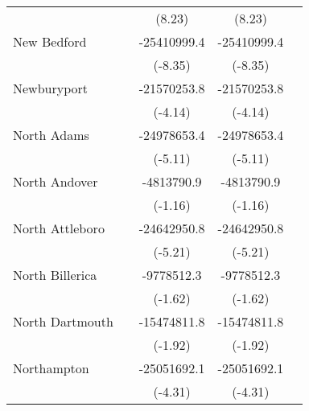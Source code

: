 {\begin{tabular}{l*{4}{c}}
                    &                     &      (8.23)         &      (8.23)         &                     \\
\addlinespace
New Bedford         &                     & -25410999.4\sym{***}& -25410999.4\sym{***}&                     \\
                    &                     &     (-8.35)         &     (-8.35)         &                     \\
\addlinespace
Newburyport         &                     & -21570253.8\sym{***}& -21570253.8\sym{***}&                     \\
                    &                     &     (-4.14)         &     (-4.14)         &                     \\
\addlinespace
North Adams         &                     & -24978653.4\sym{***}& -24978653.4\sym{***}&                     \\
                    &                     &     (-5.11)         &     (-5.11)         &                     \\
\addlinespace
North Andover       &                     &  -4813790.9         &  -4813790.9         &                     \\
                    &                     &     (-1.16)         &     (-1.16)         &                     \\
\addlinespace
North Attleboro     &                     & -24642950.8\sym{***}& -24642950.8\sym{***}&                     \\
                    &                     &     (-5.21)         &     (-5.21)         &                     \\
\addlinespace
North Billerica     &                     &  -9778512.3         &  -9778512.3         &                     \\
                    &                     &     (-1.62)         &     (-1.62)         &                     \\
\addlinespace
North Dartmouth     &                     & -15474811.8         & -15474811.8         &                     \\
                    &                     &     (-1.92)         &     (-1.92)         &                     \\
\addlinespace
Northampton         &                     & -25051692.1\sym{***}& -25051692.1\sym{***}&                     \\
                    &                     &     (-4.31)         &     (-4.31)         &                     \\

\end{tabular}}
